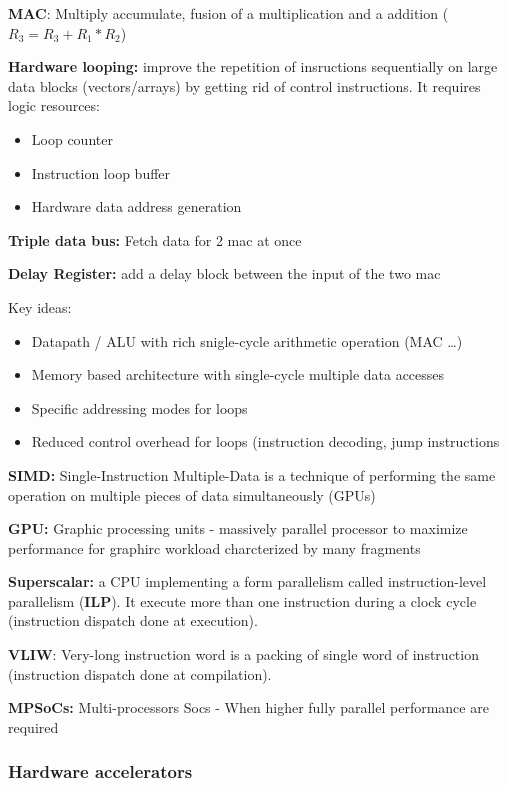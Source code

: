 \textbf{MAC}: Multiply accumulate, fusion of a multiplication and a addition (\(R_3 = R_3 + R_1 * R_2\))


\textbf{Hardware looping:} improve the repetition of insructions sequentially on large data blocks (vectors/arrays) by getting rid of control instructions. It requires logic resources:
\begin{itemize}
  \item Loop counter
  \item Instruction loop buffer
  \item Hardware data address generation
\end{itemize}

\textbf{Triple data bus:} Fetch data for 2 mac at once

\textbf{Delay Register:} add a delay block between the input of the two mac


\bigbreak
Key ideas:
\begin{itemize}
  \item Datapath / ALU with rich snigle-cycle arithmetic operation (MAC \dots)
  \item Memory based architecture with single-cycle multiple data accesses
  \item Specific addressing modes for loops
  \item Reduced control overhead for loops (instruction decoding, jump instructions
\end{itemize}

\textbf{SIMD:} Single-Instruction Multiple-Data is a technique of performing the same operation on multiple pieces of data simultaneously (GPUs)

\textbf{GPU:} Graphic processing units - massively parallel processor to maximize performance for graphirc workload charcterized by many fragments

\textbf{Superscalar:} a CPU implementing a form parallelism called instruction-level parallelism (\textbf{ILP}). It execute more than one instruction during a clock cycle (instruction dispatch done at execution).

\textbf{VLIW}: Very-long instruction word is a packing of single word of instruction (instruction dispatch done at compilation).

\textbf{MPSoCs:} Multi-processors Socs - When higher fully parallel performance are required


\subsubsection{Hardware accelerators}

